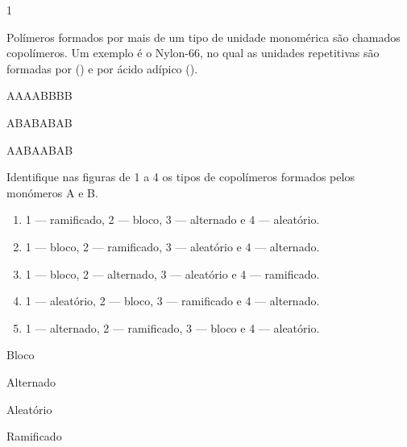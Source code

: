 \documentclass[\mainfilename]{subfiles}
\begin{document}
\begin{questionBox}1{ %
    Polímeros formados por mais de um tipo de unidade monomérica são chamados copolímeros. Um exemplo é o Nylon-66, no qual as unidades repetitivas são formadas por  () e por ácido adípico ().
    \begin{enumerate}[label=\arabic{enumi}]
        \begin{multicols}{2}
            \def\A{\textcolor{Graph21}{A}}
            \def\B{\textcolor{Graph22}{B}}
            \item {\A\A\A\A\B\B\B\B}
            \item {\A\B\A\B\A\B\A\B}
            \item {\A\A\B\A\A\B\A\B}
            \item \chemfig[atom sep={1em}]{
                \A-\A-\A
                (-[90,2]\B)
                -\A-\A-\A
                (-[90,2]\B)
                -\A-\A
            }
        \end{multicols}
        Identifique nas figuras de 1 a 4 os tipos de copolímeros formados pelos monómeros A e B.
    \end{enumerate}
    \begin{enumerate}[label=\alph{enumi}.]
        \item \textcolor{Graph41}{1 — ramificado}, 
              \textcolor{Graph42}{2 — bloco}, 
              \textcolor{Graph43}{3 — alternado} e 
              \textcolor{Graph44}{4 — aleatório}.
        \item \textcolor{Graph42}{1 — bloco}, 
              \textcolor{Graph41}{2 — ramificado}, 
              \textcolor{Graph44}{3 — aleatório} e 
              \textcolor{Graph43}{4 — alternado}.
        \item \textcolor{Graph42}{1 — bloco}, 
              \textcolor{Graph43}{2 — alternado}, 
              \textcolor{Graph44}{3 — aleatório} e 
              \textcolor{Graph41}{4 — ramificado}.
        \item \textcolor{Graph44}{1 — aleatório}, 
              \textcolor{Graph42}{2 — bloco}, 
              \textcolor{Graph41}{3 — ramificado} e 
              \textcolor{Graph43}{4 — alternado}.
        \item \textcolor{Graph43}{1 — alternado}, 
              \textcolor{Graph41}{2 — ramificado}, 
              \textcolor{Graph42}{3 — bloco} e 
              \textcolor{Graph44}{4 — aleatório}.
    \end{enumerate}
    } %
    \begin{enumerate}
        \begin{multicols}{4}
            \item \textcolor{Graph42}{Bloco}
            \item \textcolor{Graph43}{Alternado}
            \item \textcolor{Graph44}{Aleatório}
            \item \textcolor{Graph41}{Ramificado}
        \end{multicols}
    \end{enumerate}
\end{questionBox}
\end{document}
